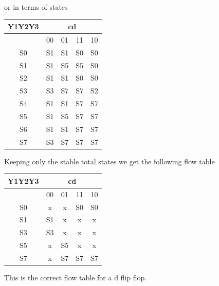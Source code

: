 \documentclass[12pt]{article}
\begin{document}
or in terms of states
\begin{center}
    \begin{tabular}{|c|c|c|c|c|}
        Y1Y2Y3 & \multicolumn{4}{c}{cd} \\
        \hline
        & 00 & 01 & 11 & 10 \\
        \hline
        S0 & S1& S1& S0& S0\\
        \hline
        S1 & S1& S5& S5& S0\\
        \hline
        S2 & S1& S1& S0& S0\\
        \hline
        S3 & S3& S7& S7& S2\\
        \hline
        S4 & S1& S1& S7& S7\\
        \hline
        S5 & S1& S5& S7& S7\\
        \hline
        S6 & S1& S1& S7& S7\\
        \hline
        S7 & S3& S7& S7& S7\\
        \hline
    \end{tabular}
\end{center}

Keeping only the stable total states we get the following flow table
\begin{center}
    \begin{tabular}{|c|c|c|c|c|}
        Y1Y2Y3 & \multicolumn{4}{c}{cd} \\
        \hline
        & 00 & 01 & 11 & 10 \\
        \hline
        S0 & x& x& S0& S0\\
\hline
S1 & S1& x& x& x\\
\hline
S3 & S3& x& x& x\\
\hline
S5 & x& S5& x& x\\
\hline
S7 & x& S7& S7& S7\\
\hline
    \end{tabular}
\end{center}
This is the correct flow table for a d flip flop.
\end{document}
